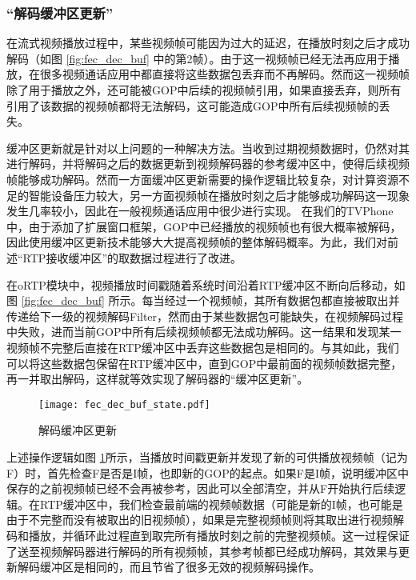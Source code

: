     \subsubsection{``解码缓冲区更新''}
    在流式视频播放过程中，某些视频帧可能因为过大的延迟，在播放时刻之后才成功解码（如图 \ref{fig:fec_dec_buf} 中的第2帧）。由于这一视频帧已经无法再应用于播放，在很多视频通话应用中都直接将这些数据包丢弃而不再解码。然而这一视频帧除了用于播放之外，还可能被GOP中后续的视频帧引用，如果直接丢弃，则所有引用了该数据的视频帧都将无法解码，这可能造成GOP中所有后续视频帧的丢失。
    
    缓冲区更新就是针对以上问题的一种解决方法。当收到过期视频数据时，仍然对其进行解码，并将解码之后的数据更新到视频解码器的参考缓冲区中，使得后续视频帧能够成功解码。然而一方面缓冲区更新需要的操作逻辑比较复杂，对计算资源不足的智能设备压力较大，另一方面视频帧在播放时刻之后才能够成功解码这一现象发生几率较小，因此在一般视频通话应用中很少进行实现。   
    在我们的TVPhone中，由于添加了扩展窗口框架，GOP中已经播放的视频帧也有很大概率被解码，因此使用缓冲区更新技术能够大大提高视频帧的整体解码概率。为此，我们对前述``RTP接收缓冲区''的取数据过程进行了改进。
    
    在oRTP模块中，视频播放时间戳随着系统时间沿着RTP缓冲区不断向后移动，如图 \ref{fig:fec_dec_buf} 所示。每当经过一个视频帧，其所有数据包都直接被取出并传递给下一级的视频解码Filter，然而由于某些数据包可能缺失，在视频解码过程中失败，进而当前GOP中所有后续视频帧都无法成功解码。这一结果和发现某一视频帧不完整后直接在RTP缓冲区中丢弃这些数据包是相同的。与其如此，我们可以将这些数据包保留在RTP缓冲区中，直到GOP中最前面的视频帧数据完整，再一并取出解码，这样就等效实现了解码器的``缓冲区更新''。

    \begin{figure}[htbp]
      \centering
      \texttt{[image: fec\_dec\_buf\_state.pdf]}
      \caption{解码缓冲区更新}
      \label{fig:fec_dec_buf_state}
    \end{figure}
    
    上述操作逻辑如图 \ref{fig:fec_dec_buf_state}所示，当播放时间戳更新并发现了新的可供播放视频帧（记为F）时，首先检查F是否是I帧，也即新的GOP的起点。如果F是I帧，说明缓冲区中保存的之前视频帧已经不会再被参考，因此可以全部清空，并从F开始执行后续逻辑。在RTP缓冲区中，我们检查最前端的视频帧数据（可能是新的I帧，也可能是由于不完整而没有被取出的旧视频帧），如果是完整视频帧则将其取出进行视频解码和播放，并循环此过程直到取完所有播放时刻之前的完整视频帧。这一过程保证了送至视频解码器进行解码的所有视频帧，其参考帧都已经成功解码，其效果与更新解码缓冲区是相同的，而且节省了很多无效的视频解码操作。

